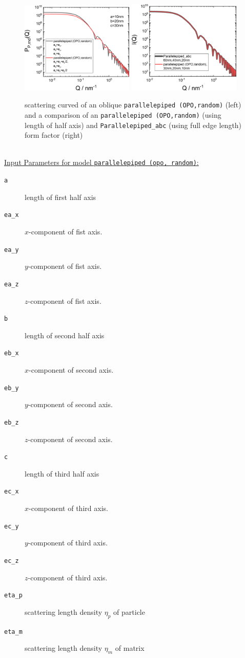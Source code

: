 \begin{figure}[htb]
\includegraphics[width=0.481\textwidth]{../images/form_factor/oriented_primitive_opbjects/parallelepipedOPOoblique.png} \hfill
\includegraphics[width=0.481\textwidth]{../images/form_factor/oriented_primitive_opbjects/parallelepipedOPOcompare.png}
\caption{scattering curved of an oblique \texttt{parallelepiped (OPO,random)} (left) and a comparison of an \texttt{parallelepiped (OPO,random)} (using length of half axis) and \texttt{Parallelepiped\_abc} (using full edge length) form factor (right)}
\label{fig:opo_ellipsoidIQrandom}
\end{figure}

~\\
\underline{Input Parameters for model \texttt{parallelepiped (opo, random)}:}
\begin{description}
\item[\texttt{a}] length of first half axis
\item[\texttt{ea\_x}] $x$-component of fist axis.
\item[\texttt{ea\_y}] $y$-component of fist axis.
\item[\texttt{ea\_z}] $z$-component of fist axis.
\item[\texttt{b}] length of second half axis
\item[\texttt{eb\_x}] $x$-component of second axis.
\item[\texttt{eb\_y}] $y$-component of second axis.
\item[\texttt{eb\_z}] $z$-component of second axis.
\item[\texttt{c}] length of third half axis
\item[\texttt{ec\_x}] $x$-component of third axis.
\item[\texttt{ec\_y}] $y$-component of third axis.
\item[\texttt{ec\_z}] $z$-component of third axis.
\item[\texttt{eta\_p}] scattering length density $\eta_p$ of particle
\item[\texttt{eta\_m}] scattering length density $\eta_m$ of matrix
\end{description}

